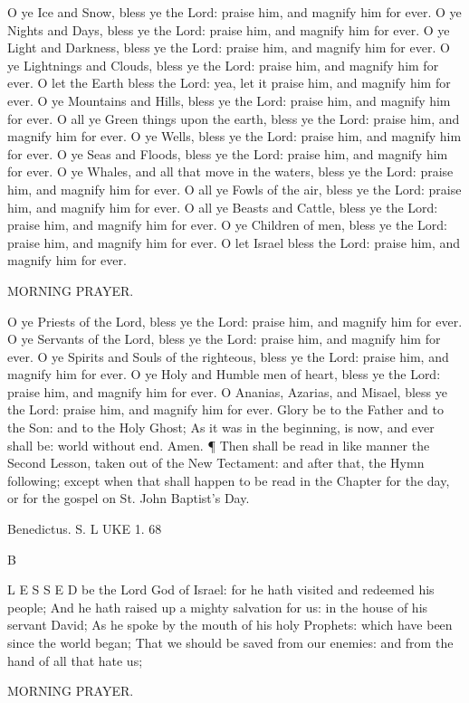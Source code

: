 O ye Ice and Snow, bless ye the Lord: praise him, and magnify him for ever. O ye Nights and Days, bless ye the Lord: praise him, and magnify him for ever. O ye Light and Darkness, bless ye the Lord: praise him, and magnify him for ever. O ye Lightnings and Clouds, bless ye the Lord: praise him, and magnify him for ever. O let the Earth bless the Lord: yea, let it praise him, and magnify him for ever. O ye Mountains and Hills, bless ye the Lord: praise him, and magnify him for ever. O all ye Green things upon the earth, bless ye the Lord: praise him, and magnify him for ever. O ye Wells, bless ye the Lord: praise him, and magnify him for ever. O ye Seas and Floods, bless ye the Lord: praise him, and magnify him for ever. O ye Whales, and all that move in the waters, bless ye the Lord: praise him, and magnify him for ever. O all ye Fowls of the air, bless ye the Lord: praise him, and magnify him for ever. O all ye Beasts and Cattle, bless ye the Lord: praise him, and magnify him for ever. O ye Children of men, bless ye the Lord: praise him, and magnify him for ever. O let Israel bless the Lord: praise him, and magnify him for ever.

MORNING PRAYER.

O ye Priests of the Lord, bless ye the Lord: praise him, and magnify him for ever. O ye Servants of the Lord, bless ye the Lord: praise him, and magnify him for ever. O ye Spirits and Souls of the righteous, bless ye the Lord: praise him, and magnify him for ever. O ye Holy and Humble men of heart, bless ye the Lord: praise him, and magnify him for ever. O Ananias, Azarias, and Misael, bless ye the Lord: praise him, and magnify him for ever. Glory be to the Father and to the Son: and to the Holy Ghost; As it was in the beginning, is now, and ever shall be: world without end. Amen. ¶ Then shall be read in like manner the Second Lesson, taken out of the New Tectament: and after that, the Hymn following; except when that shall happen to be read in the Chapter for the day, or for the gospel on St. John Baptist’s Day.

Benedictus. S. L UKE 1. 68

B

L E S S E D be the Lord God of Israel: for he hath visited and redeemed his people; And he hath raised up a mighty salvation for us: in the house of his servant David; As he spoke by the mouth of his holy Prophets: which have been since the world began; That we should be saved from our enemies: and from the hand of all that hate us;

MORNING PRAYER.

